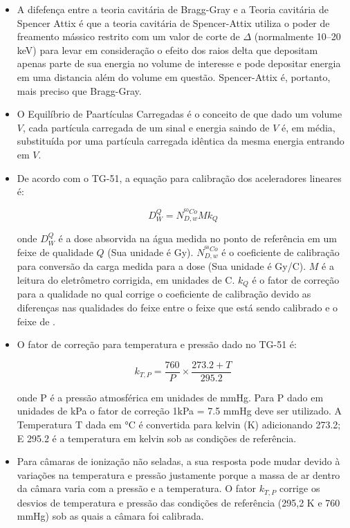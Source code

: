 \documentclass[11pt,a4paper]{article}
\newcounter{exemplo}
\begin{document}
\begin{exemplo}
\begin{itemize}
        \item A difefença entre a teoria cavitária de Bragg-Gray e a Teoria cavitária de Spencer Attix é que a teoria cavitária de Spencer-Attix utiliza o poder de freamento mássico restrito com um valor de corte de $\Delta$ (normalmente 10–20 keV) para levar em consideração o efeito dos raios delta que depositam apenas parte de sua energia no volume de interesse e pode depositar energia em uma distancia além do volume em questão. Spencer-Attix é, portanto, mais preciso que Bragg-Gray.
        
        \item O Equilíbrio de Paartículas Carregadas é o conceito de que dado um volume $V$, cada partícula carregada de um sinal e energia saindo de $V$ é, em média, substituída por uma partícula carregada idêntica da mesma energia entrando em $V$.
        
        \item De acordo com o TG-51, a equação para calibração dos aceleradores lineares é:
        
            $$D_W^Q = N_{D,w}^{{}^{60}Co} M k_Q$$
        
        onde $D_W^Q $ é a dose absorvida na água medida no ponto de referência em um feixe de qualidade $Q$ (Sua unidade é Gy). $N_{D,w}^{{}^{60}Co}$ é o coeficiente de calibração para conversão da carga medida para a dose (Sua unidade é Gy/C). $M$ é a leitura do eletrômetro corrigida, em unidades de C. $k_Q$ é o fator de correção para a qualidade no qual corrige o coeficiente de calibração devido as diferenças nas qualidades do feixe entre o feixe que está sendo calibrado e o feixe de .

        \item O fator de correção para temperatura e pressão dado no TG-51 é:
        
            $$k_{T,P} = \frac{760}{P} \times \frac{273.2 + T}{295.2}$$

        onde P é a pressão atmosférica em unidades de mmHg. Para P dado em unidades de kPa o fator de correção 1kPa = 7.5 mmHg deve ser utilizado. A Temperatura T dada em \unit{\celsius} é convertida para kelvin (K) adicionando 273.2; E 295.2 é a temperatura em kelvin sob as condições de referência.


        \item Para câmaras de ionização não seladas, a sua resposta pode mudar devido à variações na temperatura e pressão justamente porque a massa de ar dentro da câmara varia com a pressão e a temperatura. O fator $k_{T,P}$ corrige os desvios de temperatura e pressão das condições de referência (295,2 K e 760 mmHg) sob as quais a câmara foi calibrada.
        

\end{itemize}
\end{exemplo}
\end{document}
